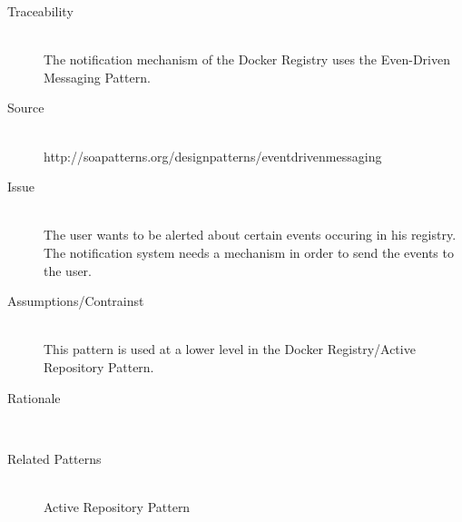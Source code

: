 \begin{description}

\item[Traceability]~\\
The notification mechanism of the Docker Registry uses the Even-Driven Messaging Pattern.

\item[Source]~\\
http://soapatterns.org/designpatterns/eventdrivenmessaging

\item[Issue]~\\ The user wants to be alerted about certain events occuring in his registry.
The notification system needs a mechanism in order to send the events to the user.

\item[Assumptions/Contrainst]~\\ This pattern is used at a lower level in the Docker Registry/Active Repository Pattern.


\item[Rationale]~\\ 


\item [Related Patterns]~\\
Active Repository Pattern


\end{description}

